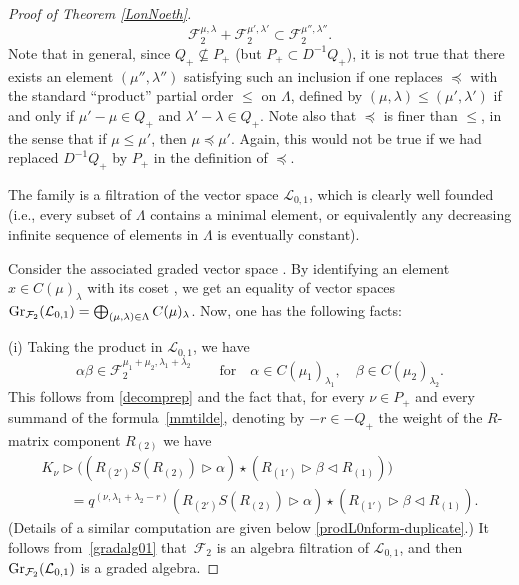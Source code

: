 \documentclass[pdftex]{sigma}
\numberwithin{equation}{section}
\theoremstyle{definition}
\newcommand{\Ll}{{\mathcal L}}
\begin{document}
\begin{proof}[Proof of Theorem \ref{LonNoeth}]
\[{\mathcal F}_2^{\mu,\lambda}+ {\mathcal F}_2^{\mu',\lambda'} \subset {\mathcal F}_2^{\mu'',\lambda''}.\]
Note that in general, since $Q_+\nsubseteq P_+$ (but $P_+\subset D^{-1}Q_+$), it is not true that there exists an element $(\mu'',\lambda'')$ satisfying such an inclusion if one replaces $\preceq$ with the standard ``product'' partial order $\leq$ on $\Lambda$, defined by $(\mu,\lambda)\leq (\mu', \lambda')$ if and only if $\mu'-\mu\in Q_+$ and $\lambda'-\lambda\in Q_+$. Note also that $\preceq$ is finer than $\leq$, in the sense that if $\mu \leq \mu'$, then $\mu\preceq \mu'$. Again, this would not be true if we had replaced $D^{-1}Q_+$ by $P_+$ in the definition of $\preceq$.

The family  is a filtration of the vector space $ {\mathcal L}_{0,1}$, which is clearly well founded (i.e., every subset of $\Lambda$ contains a minimal element, or equivalently any decreasing infinite sequence of elements in $\Lambda$ is eventually constant).

Consider the associated graded vector space . By identifying an element $x\in C(\mu)_\lambda$ with its coset , we get an equality of vector spaces $ {\rm Gr}_{{\mathcal F}_2}({\mathcal L}_{0,1})= \bigoplus_{(\mu,\lambda)\in \Lambda} C(\mu)_\lambda$. Now, one has the following facts:

(i) Taking the product in $\Ll_{0,1}$, we have
\begin{equation}\label{gradalg01}
\alpha \beta\in {\mathcal F}_2^{\mu_1+\mu_2,\lambda_1+\lambda_2}\qquad \mathrm{for}\quad \alpha \in C(\mu_1)_{\lambda_1},\quad \beta \in C(\mu_2)_{\lambda_2}.
\end{equation}
This follows from \eqref{decomprep} and the fact that, for every $\nu\in P_+$ and every summand of the formula~\eqref{mmtilde}, denoting by $-r\in -Q_+$ the weight of the $R$-matrix component $R_{(2)}$ we have
\begin{gather*}%
K_\nu\rhd \bigl((R_{(2')}{S}(R_{(2)}) \rhd \alpha) \star (R_{(1')}\rhd \beta \lhd R_{(1)})\bigr) \\
\qquad= q^{(\nu,\lambda_1+\lambda_2-r)}(R_{(2')}{S}(R_{(2)}) \rhd \alpha) \star (R_{(1')}\rhd \beta \lhd R_{(1)}).
\end{gather*}
(Details of a similar computation are given below \eqref{prodL0nform-duplicate}.) It follows from~\eqref{gradalg01} that~$\mathcal{F}_2$ is an algebra filtration of $\Ll_{0,1}$, and then ${\rm Gr}_{\mathcal F_2}({\mathcal L}_{0,1})$ is a graded algebra.


\end{proof}
\end{document}
